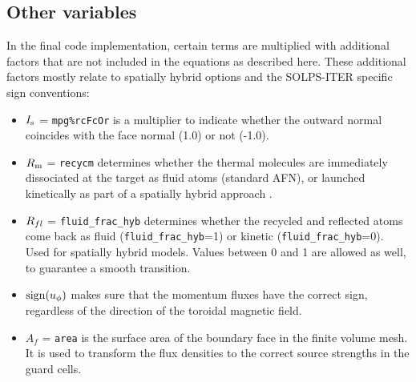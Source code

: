 \subsection{Other variables}

In the final code implementation, certain terms are multiplied with additional factors that are not included in the equations as described here. These additional factors mostly relate to spatially hybrid options \cite{wim2022,psi_niels,psi_maarten} and the SOLPS-ITER specific sign conventions:

\begin{itemize}
    \item $I_\mathrm{s}$ = \texttt{mpg\%rcFcOr} is a multiplier to indicate whether the outward normal coincides with the face normal (1.0) or not (-1.0).
    \item $R_{\mathrm{m}}$ = \texttt{recycm} determines whether the thermal molecules are immediately dissociated at the target as fluid atoms (standard AFN), or launched kinetically as part of a spatially hybrid approach \cite{wim2022,psi_niels}.
    \item $R_{fl}$ = \texttt{fluid\_frac\_hyb} determines whether the recycled and reflected atoms come back as fluid (\texttt{fluid\_frac\_hyb}=1) or kinetic (\texttt{fluid\_frac\_hyb}=0). Used for spatially hybrid models. Values between 0 and 1 are allowed as well, to guarantee a smooth transition.
    \item $\mathrm{sign}(u_\phi)$ makes sure that the momentum fluxes have the correct sign, regardless of the direction of the toroidal magnetic field.
    \item $A_f$ = \texttt{area} is the surface area of the boundary face in the finite volume mesh. It is used to transform the flux densities to the correct source strengths in the guard cells.
\end{itemize}




